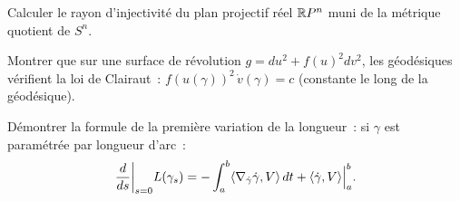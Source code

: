 \begin{exercice}
Calculer le rayon d'injectivit\'e du plan projectif r\'eel $\mathbb{R} P^n$ muni de la
m\'etrique quotient de $S^n$.
\end{exercice}

\begin{exercice}
Montrer que sur une surface de r\'evolution $g = du^2 + f(u)^2 dv^2$, les
g\'eod\'esiques v\'erifient la loi de Clairaut~: $f(u(\gamma))^2\, \dot v(\gamma) = c$
(constante le long de la g\'eod\'esique).
\end{exercice}

\begin{exercice}
D\'emontrer la formule de la premi\`ere variation de la longueur~: si $\gamma$ est
param\'etr\'ee par longueur d'arc~:
\[
    \frac{d}{ds}\bigg|_{s=0} L(\gamma_s)
    = -\int_a^b \langle \nabla_{\dot\gamma}\dot\gamma, V \rangle\, dt
    + \langle \dot\gamma, V \rangle\Big|_a^b.
\]
\end{exercice}
